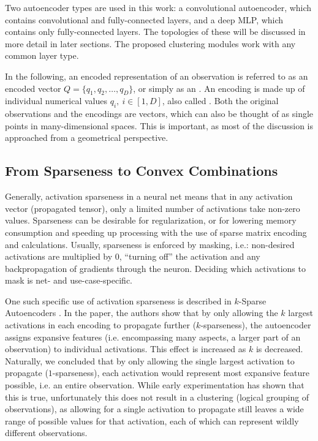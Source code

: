 			Two autoencoder types are used in this work: a convolutional autoencoder, which contains convolutional and fully-connected layers, and a deep \ac{MLP}, which contains only fully-connected layers.
			The topologies of these will be discussed in more detail in later sections.
			The proposed clustering modules work with any common layer type.
			
			In the following, an encoded representation of an observation is referred to as an encoded vector $Q = \{q_1, q_2, \dots, q_D\}$, or simply as an .
			An encoding is made up of individual numerical values $q_i,\: i \in [1, D]$, also called .
			Both the original observations and the encodings are vectors, which can also be thought of as single points in many-dimensional spaces.
			This is important, as most of the discussion is approached from a geometrical perspective.
			
		\subsection{From Sparseness to Convex Combinations}
		
			Generally, activation sparseness in a neural net means that in any activation vector (propagated tensor), only a limited number of activations take non-zero values.
			Sparseness can be desirable for regularization, or for lowering memory consumption and speeding up processing with the use of sparse matrix encoding and calculations.
			Usually, sparseness is enforced by masking, i.e.: non-desired activations are multiplied by $0$, ``turning off'' the activation and any backpropagation of gradients through the neuron.
			Deciding which activations to mask is net- and use-case-specific.
			
			One such specific use of activation sparseness is described in $k$-Sparse Autoencoders \cite{ksparse}.
			In the paper, the authors show that by only allowing the $k$ largest activations in each encoding to propagate further ($k$-sparseness), the autoencoder assigns expansive features (i.e. encompassing many aspects, a larger part of an observation) to individual activations.
			This effect is increased as $k$ is decreased.
			Naturally, we concluded that by only allowing the single largest activation to propagate ($1$-sparseness), each activation would represent most expansive feature possible, i.e. an entire observation.
			While early experimentation has shown that this is true, unfortunately this does not result in a clustering (logical grouping of observations), as allowing for a single activation to propagate still leaves a wide range of possible values for that activation, each of which can represent wildly different observations.
			

